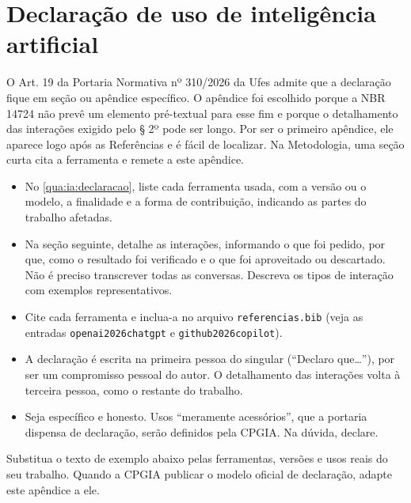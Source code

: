 \chapter{Declaração de uso de inteligência artificial}
\label{ap:ia}

\begin{instrucao}
O Art. 19 da Portaria Normativa nº 310/2026 da Ufes \cite{ufes2026portaria}
admite que a declaração fique em seção ou apêndice específico. O apêndice foi
escolhido porque a NBR 14724 não prevê um elemento pré-textual para esse fim e
porque o detalhamento das interações exigido pelo § 2º pode ser longo. Por ser
o primeiro apêndice, ele aparece logo após as Referências e é fácil de
localizar. Na Metodologia, uma seção curta cita a ferramenta e remete a este
apêndice.

\begin{itemize}
  \item No \cref{qua:ia:declaracao}, liste cada ferramenta usada, com a versão
        ou o modelo, a finalidade e a forma de contribuição, indicando as
        partes do trabalho afetadas.
  \item Na seção seguinte, detalhe as interações, informando o que foi pedido,
        por que, como o resultado foi verificado e o que foi aproveitado ou
        descartado.
        Não é preciso transcrever todas as conversas. Descreva os tipos de
        interação com exemplos representativos.
  \item Cite cada ferramenta e inclua-a no arquivo \verb|referencias.bib|
        (veja as entradas \verb|openai2026chatgpt| e \verb|github2026copilot|).
  \item A declaração é escrita na primeira pessoa do singular (``Declaro
        que\ldots''), por ser um compromisso pessoal do autor. O detalhamento
        das interações volta à terceira pessoa, como o restante do trabalho.
  \item Seja específico e honesto. Usos ``meramente acessórios'', que a
        portaria dispensa de declaração, serão definidos pela CPGIA. Na dúvida,
        declare.
\end{itemize}
Substitua o texto de exemplo abaixo pelas ferramentas, versões e usos reais
do seu trabalho. Quando a CPGIA publicar o modelo oficial de declaração,
adapte este apêndice a ele.
\end{instrucao}

